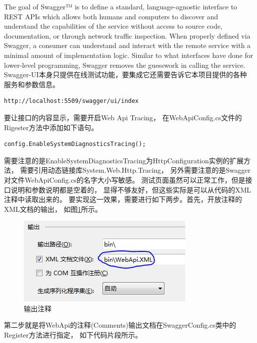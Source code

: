 \documentclass{book}
\begin{document}
The goal of Swagger™ is to define a standard, 
language-agnostic interface to REST APIs which allows both humans 
and computers to discover and understand the capabilities 
of the service without access to source code, documentation, 
or through network traffic inspection. 
When properly defined via Swagger, 
a consumer can understand and interact with the remote service 
with a minimal amount of implementation logic. 
Similar to what interfaces have done for lower-level programming, 
Swagger removes the guesswork in calling the service.
Swagger-UI本身只提供在线测试功能，要集成它还需要告诉它本项目提供的各种服务和参数信息。

\begin{lstlisting}[language=HTML,caption=Swagger链接]
http://localhost:5509/swagger/ui/index
\end{lstlisting}

要让接口的内容显示，需要开启Web Api Tracing，
在WebApiConfig.cs文件的Rigester方法中添加如下语句。

\begin{lstlisting}[language={[Sharp]C},caption=开启Tracing]
config.EnableSystemDiagnosticsTracing();
\end{lstlisting}

需要注意的是EnableSystemDiagnosticsTracing为HttpConfiguration实例的扩展方法，
需要引用动态链接库System.Web.Http.Tracing，
另外需要注意的是Swagger对文件WebApiConfig.cs的名字大小写敏感。
测试页面虽然可以正常工作，但是接口说明和参数说明都是空着的，
显得不够友好，但这些实际是可以从代码的XML注释中读取出来的。
要实现这一效果，需要进行如下两步。首先，开放注释的XML文档的输出，
如图\ref{fig:WebApiOutputComment}所示。

\begin{figure}[htbp]
	\centering
	\includegraphics[scale=1]{WebApiOutputComment.jpg}
	\caption{输出注释}
	\label{fig:WebApiOutputComment}
\end{figure}

第二步就是将WebApi的注释(Comments)输出文档在SwaggerConfig.cs类中的Register方法进行指定，
如下代码片段所示。
\end{document}

